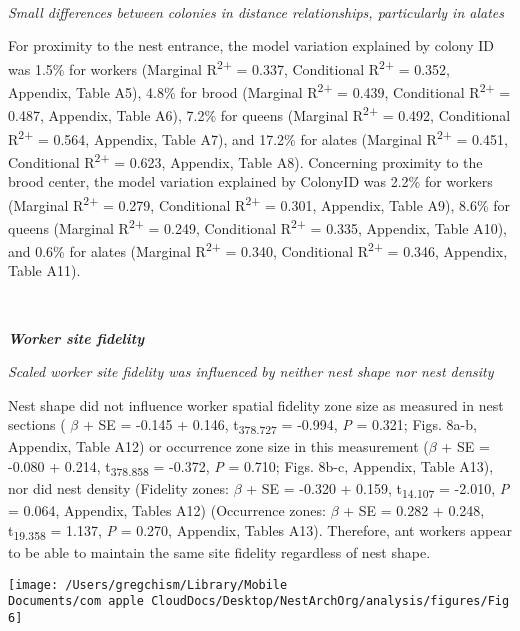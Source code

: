 \documentclass[3p]{elsarticle} %
\begin{document}
~

\emph{Small differences between colonies in distance relationships,
particularly in alates}

For proximity to the nest entrance, the model variation explained by
colony ID was 1.5\% for workers (Marginal R\textsuperscript{2+} = 0.337,
Conditional R\textsuperscript{2+} = 0.352, Appendix, Table A5), 4.8\%
for brood (Marginal R\textsuperscript{2+} = 0.439, Conditional
R\textsuperscript{2+} = 0.487, Appendix, Table A6), 7.2\% for queens
(Marginal R\textsuperscript{2+} = 0.492, Conditional
R\textsuperscript{2+} = 0.564, Appendix, Table A7), and 17.2\% for
alates (Marginal R\textsuperscript{2+} = 0.451, Conditional
R\textsuperscript{2+} = 0.623, Appendix, Table A8). Concerning proximity
to the brood center, the model variation explained by ColonyID was 2.2\%
for workers (Marginal R\textsuperscript{2+} = 0.279, Conditional
R\textsuperscript{2+} = 0.301, Appendix, Table A9), 8.6\% for queens
(Marginal R\textsuperscript{2+} = 0.249, Conditional
R\textsuperscript{2+} = 0.335, Appendix, Table A10), and 0.6\% for
alates (Marginal R\textsuperscript{2+} = 0.340, Conditional
R\textsuperscript{2+} = 0.346, Appendix, Table A11).

~

\textbf{\emph{Worker site fidelity}}

\emph{Scaled worker site fidelity was influenced by neither nest shape
nor nest density}

Nest shape did not influence worker spatial fidelity zone size as
measured in nest sections ( \(\beta\) + SE = -0.145 + 0.146,
t\textsubscript{378.727} = -0.994, \emph{P} = 0.321; Figs. 8a-b,
Appendix, Table A12) or occurrence zone size in this measurement
(\(\beta\) + SE = -0.080 + 0.214, t\textsubscript{378.858} = -0.372,
\emph{P} = 0.710; Figs. 8b-c, Appendix, Table A13), nor did nest density
(Fidelity zones: \(\beta\) + SE = -0.320 + 0.159,
t\textsubscript{14.107} = -2.010, \emph{P} = 0.064, Appendix, Tables
A12) (Occurrence zones: \(\beta\) + SE = 0.282 + 0.248,
t\textsubscript{19.358} = 1.137, \emph{P} = 0.270, Appendix, Tables
A13). Therefore, ant workers appear to be able to maintain the same site
fidelity regardless of nest shape.

\begin{flushleft}\texttt{[image: /Users/gregchism/Library/Mobile Documents/com~apple~CloudDocs/Desktop/NestArchOrg/analysis/figures/Fig6]} \end{flushleft}
\end{document}
